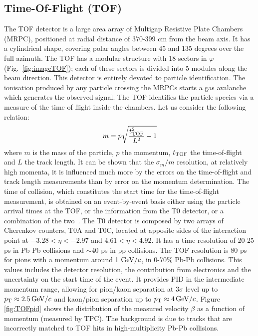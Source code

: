 \subsection{Time-Of-Flight (TOF)}
\label{sec:TOF}
The TOF detector is a large area array of Multigap Resistive Plate Chambers (MRPC), 
positioned at radial distance of 370-399 cm from the beam axis. It has a cylindrical 
shape, covering polar angles between 45 and 135 degrees over the full azimuth. 
The TOF has a modular structure with 18 sectors in $\varphi$ (Fig.~\ref{fig:imageTOF}); each 
of these sectors is divided into 5 modules along the beam direction. 
This detector is entirely devoted to particle identification. 
The ionisation produced by any particle crossing the MRPCs starts a gas avalanche 
which generates the observed signal. The TOF identifies the particle species via a measure of the time of flight 
inside the chambers. Let us consider the following relation:
\[
m = p \sqrt{\frac{t^2_{\rm TOF}}{L^2}-1}
\]
where $m$ is the mass of the particle, $p$ the momentum, $t_{\rm TOF}$ the time-of-flight and 
$L$  the track length. It can be shown that the $\sigma_m/m$ resolution, at relatively high
 momenta, it is influenced much more by the errors on the time-of-flight and track length 
 measurements than by error on the momentum determination.
 The time of collision, which constitutes the start time for the time-of-flight measurement,
 is obtained on an event-by-event basis either using the particle arrival times
 at the TOF, or the information from the T0 detector, or a combination of the two~\cite{Adam:2016ilk}. 
 The T0 detector is composed by two arrays of
Cherenkov counters, T0A and T0C, located at apposite sides of the interaction point at 
$-3.28 < \eta < - 2.97$ and $4.61 < \eta < 4.92$. It has a time resolution of 20-25 ps
 in Pb-Pb collisions and $\sim 40$ ps in pp collisions.
 The TOF resolution is 80 ps for pions with a momentum around 1 $\mathrm{GeV}/c$, in 0-70\% Pb-Pb collisions.
This values includes the detector resolution, the contribution from electronics and the uncertainty
on the start time of the event.
It provides PID in the intermediate momentum range, allowing for pion/kaon separation at 3$\sigma$ level
up to $p_{\rm T} \approx 2.5 \,\mathrm{GeV}/c$  and kaon/pion separation up to $p_{\rm T} \approx 4 \,\mathrm{GeV}/c$.
Figure \ref{fig:TOFpid} shows the distribution of the measured velocity $\beta$ as a function of momentum (measured by TPC). 
The background is due to tracks that are incorrectly matched to TOF hits in high-multiplicity Pb-Pb collisions.
